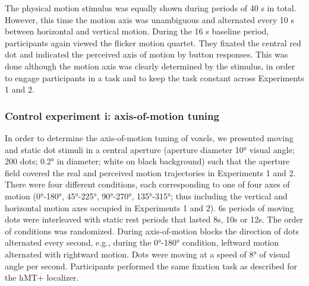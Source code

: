 The physical motion stimulus was equally shown during periods of 40 s in total. However, this time the motion axis was unambiguous and alternated every 10 s between horizontal and vertical motion. During the 16 s baseline period, participants again viewed the flicker motion quartet. They fixated the central red dot and indicated the perceived axis of motion by button responses. This was done although the motion axis was clearly determined by the stimulus, in order to engage participants in a task and to keep the task constant across Experiments 1 and 2.

\subsubsection{Control experiment i: axis-of-motion tuning}
In order to determine the axis-of-motion tuning of voxels, we presented moving and static dot stimuli in a central aperture (aperture diameter 10° visual angle; 200 dots; 0.2° in diameter; white on black background) such that the aperture field covered the real and perceived motion trajectories in Experiments 1 and 2. There were four different conditions, each corresponding to one of four axes of motion (0°-180°, 45°-225°, 90°-270°, 135°-315°; thus including the vertical and horizontal motion axes occupied in Experiments 1 and 2). 6s periods of moving dots were interleaved with static rest periods that lasted 8s, 10s or 12s. The order of conditions was randomized. During axis-of-motion blocks the direction of dots alternated every second, e.g., during the 0°-180° condition, leftward motion alternated with rightward motion. Dots were moving at a speed of 8° of visual angle per second. Participants performed the same fixation task as described for the hMT+ localizer.

